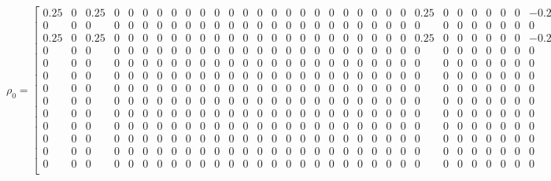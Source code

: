 \documentclass[10pt, a4paper]{article}
\begin{document}
\begin{sloppypar}
    \FloatBarrier
    \begin{figure}[ht]
      \centering
      \setcounter{MaxMatrixCols}{33}
      \[
        \rho_{0}= \left[
        \begin{smallmatrix}
          0.25  & 0 & 0.25  & 0 & 0 & 0 & 0 & 0 & 0 & 0 & 0 & 0 & 0 & 0 & 0 & 0 & 0 & 0 & 0 & 0 & 0 & 0 & 0 & 0 & 0.25  & 0 & 0 & 0 & 0 & 0 & 0 & -0.25 \\
          0     & 0 & 0     & 0 & 0 & 0 & 0 & 0 & 0 & 0 & 0 & 0 & 0 & 0 & 0 & 0 & 0 & 0 & 0 & 0 & 0 & 0 & 0 & 0 & 0     & 0 & 0 & 0 & 0 & 0 & 0 & 0     \\
          0.25  & 0 & 0.25  & 0 & 0 & 0 & 0 & 0 & 0 & 0 & 0 & 0 & 0 & 0 & 0 & 0 & 0 & 0 & 0 & 0 & 0 & 0 & 0 & 0 & 0.25  & 0 & 0 & 0 & 0 & 0 & 0 & -0.25 \\
          0     & 0 & 0     & 0 & 0 & 0 & 0 & 0 & 0 & 0 & 0 & 0 & 0 & 0 & 0 & 0 & 0 & 0 & 0 & 0 & 0 & 0 & 0 & 0 & 0     & 0 & 0 & 0 & 0 & 0 & 0 & 0     \\
          0     & 0 & 0     & 0 & 0 & 0 & 0 & 0 & 0 & 0 & 0 & 0 & 0 & 0 & 0 & 0 & 0 & 0 & 0 & 0 & 0 & 0 & 0 & 0 & 0     & 0 & 0 & 0 & 0 & 0 & 0 & 0     \\
          0     & 0 & 0     & 0 & 0 & 0 & 0 & 0 & 0 & 0 & 0 & 0 & 0 & 0 & 0 & 0 & 0 & 0 & 0 & 0 & 0 & 0 & 0 & 0 & 0     & 0 & 0 & 0 & 0 & 0 & 0 & 0     \\
          0     & 0 & 0     & 0 & 0 & 0 & 0 & 0 & 0 & 0 & 0 & 0 & 0 & 0 & 0 & 0 & 0 & 0 & 0 & 0 & 0 & 0 & 0 & 0 & 0     & 0 & 0 & 0 & 0 & 0 & 0 & 0     \\
          0     & 0 & 0     & 0 & 0 & 0 & 0 & 0 & 0 & 0 & 0 & 0 & 0 & 0 & 0 & 0 & 0 & 0 & 0 & 0 & 0 & 0 & 0 & 0 & 0     & 0 & 0 & 0 & 0 & 0 & 0 & 0     \\
          0     & 0 & 0     & 0 & 0 & 0 & 0 & 0 & 0 & 0 & 0 & 0 & 0 & 0 & 0 & 0 & 0 & 0 & 0 & 0 & 0 & 0 & 0 & 0 & 0     & 0 & 0 & 0 & 0 & 0 & 0 & 0     \\
          0     & 0 & 0     & 0 & 0 & 0 & 0 & 0 & 0 & 0 & 0 & 0 & 0 & 0 & 0 & 0 & 0 & 0 & 0 & 0 & 0 & 0 & 0 & 0 & 0     & 0 & 0 & 0 & 0 & 0 & 0 & 0     \\
          0     & 0 & 0     & 0 & 0 & 0 & 0 & 0 & 0 & 0 & 0 & 0 & 0 & 0 & 0 & 0 & 0 & 0 & 0 & 0 & 0 & 0 & 0 & 0 & 0     & 0 & 0 & 0 & 0 & 0 & 0 & 0     \\
          0     & 0 & 0     & 0 & 0 & 0 & 0 & 0 & 0 & 0 & 0 & 0 & 0 & 0 & 0 & 0 & 0 & 0 & 0 & 0 & 0 & 0 & 0 & 0 & 0     & 0 & 0 & 0 & 0 & 0 & 0 & 0     \\
          0     & 0 & 0     & 0 & 0 & 0 & 0 & 0 & 0 & 0 & 0 & 0 & 0 & 0 & 0 & 0 & 0 & 0 & 0 & 0 & 0 & 0 & 0 & 0 & 0     & 0 & 0 & 0 & 0 & 0 & 0 & 0     \\

\end{smallmatrix}\]
\end{figure}
\end{sloppypar}
\end{document}
